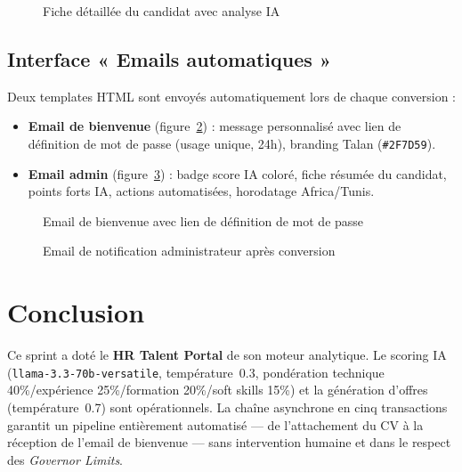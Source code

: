 \begin{figure}[hbt!]
  \centering
  \caption{Fiche détaillée du candidat avec analyse IA}
  \label{fig:detail_candidat}
\end{figure}
\FloatBarrier

\subsection{Interface « Emails automatiques »}

Deux templates HTML sont envoyés automatiquement lors de chaque conversion :

\begin{itemize}
    \item \textbf{Email de bienvenue} (figure~\ref{fig:email_bienvenue}) : message personnalisé avec lien de définition de mot de passe (usage unique, 24h), branding Talan (\texttt{\#2F7D59}).
    \item \textbf{Email admin} (figure~\ref{fig:email_admin}) : badge score IA coloré, fiche résumée du candidat, points forts IA, actions automatisées, horodatage Africa/Tunis.
\end{itemize}

\begin{figure}[hbt!]
  \centering
  \caption{Email de bienvenue avec lien de définition de mot de passe}
  \label{fig:email_bienvenue}
\end{figure}

\begin{figure}[hbt!]
  \centering
  \caption{Email de notification administrateur après conversion}
  \label{fig:email_admin}
\end{figure}
\FloatBarrier

\section{Conclusion}

Ce sprint a doté le \textbf{HR Talent Portal} de son moteur analytique. Le scoring IA (\texttt{llama-3.3-70b-versatile}, température~0.3, pondération technique 40\%/expérience 25\%/formation 20\%/soft skills 15\%) et la génération d'offres (température~0.7) sont opérationnels. La chaîne asynchrone en cinq transactions garantit un pipeline entièrement automatisé --- de l'attachement du CV à la réception de l'email de bienvenue --- sans intervention humaine et dans le respect des \textit{Governor Limits}.

